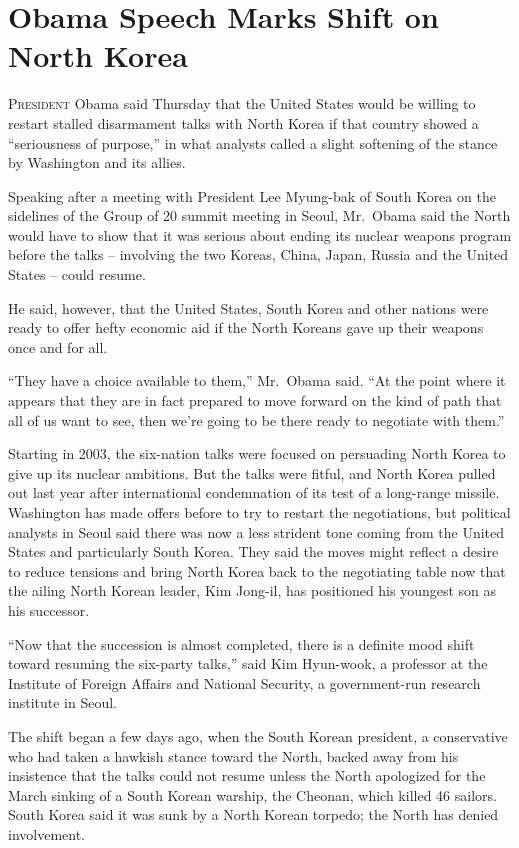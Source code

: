 ﻿\documentclass[12pt]{article}
\begin{document}
\section{Obama Speech Marks Shift on North Korea}

\lettrine{P}{resident} Obama said Thursday that the United States would be
willing to restart stalled disarmament talks with North Korea if that country showed a ``seriousness
of purpose,'' in what analysts called a slight softening of the stance by Washington and its allies.

Speaking after a meeting with President Lee Myung-bak of South Korea on the sidelines of the Group
of 20 summit meeting in Seoul, Mr.~Obama said the North would have to show that it was serious about
ending its nuclear weapons program before the talks -- involving the two Koreas, China, Japan,
Russia and the United States -- could resume.

He said, however, that the United States, South Korea and other nations were ready to offer hefty
economic aid if the North Koreans gave up their weapons once and for all.

``They have a choice available to them,'' Mr.~Obama said. ``At the point where it appears that they
are in fact prepared to move forward on the kind of path that all of us want to see, then we're
going to be there ready to negotiate with them.''

Starting in 2003, the six-nation talks were focused on persuading North Korea to give up its nuclear
ambitions. But the talks were fitful, and North Korea pulled out last year after international
condemnation of its test of a long-range missile. Washington has made offers before to try to
restart the negotiations, but political analysts in Seoul said there was now a less strident tone
coming from the United States and particularly South Korea. They said the moves might reflect a
desire to reduce tensions and bring North Korea back to the negotiating table now that the ailing
North Korean leader, Kim Jong-il, has positioned his youngest son as his successor.

``Now that the succession is almost completed, there is a definite mood shift toward resuming the
six-party talks,'' said Kim Hyun-wook, a professor at the Institute of Foreign Affairs and National
Security, a government-run research institute in Seoul.

The shift began a few days ago, when the South Korean president, a conservative who had taken a
hawkish stance toward the North, backed away from his insistence that the talks could not resume
unless the North apologized for the March sinking of a South Korean warship, the Cheonan, which
killed 46 sailors. South Korea said it was sunk by a North Korean torpedo; the North has denied
involvement.
\end{document}
